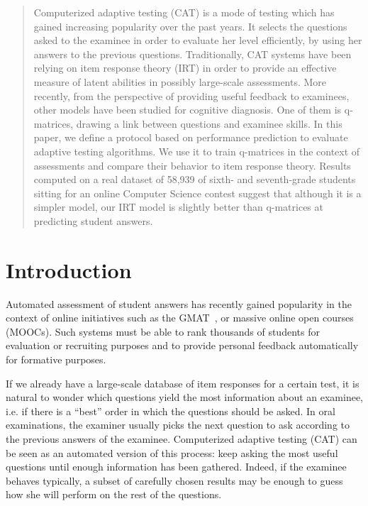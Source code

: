 \documentclass{sig-alternate}
\begin{document}
\maketitle
\begin{abstract}
Computerized adaptive testing (CAT) is a mode of testing which has gained increasing popularity over the past years. It selects the questions asked to the examinee in order to evaluate her level efficiently, by using her answers to the previous questions.
Traditionally, CAT systems have been relying on item response theory (IRT) in order to provide an effective measure of latent abilities in possibly large-scale assessments.
More recently, from the perspective of providing useful feedback to examinees, other models have been studied for cognitive diagnosis. One of them is q-matrices, drawing a link between questions and examinee skills.
In this paper, we define a protocol based on performance prediction to evaluate adaptive testing algorithms. We use it to train q-matrices in the context of assessments and compare their behavior to item response theory.
Results computed on a real dataset of 58,939 of sixth- and seventh-grade students sitting for an online Computer Science contest suggest that although it is a simpler model, our IRT model is slightly better than q-matrices at predicting student answers.
\end{abstract}




\newpage

\section{Introduction}
Automated assessment of student answers has recently gained popularity in the context of online initiatives such as the GMAT~\cite{Rudner2010}, or massive online open courses (MOOCs). Such systems must be able to rank thousands of students for evaluation or recruiting purposes and to provide personal feedback automatically for formative purposes.

If we already have a large-scale database of item responses for a certain test, it is natural to wonder which questions yield the most information about an examinee, i.e. if there is a ``best'' order in which the questions should be asked. In oral examinations, the examiner usually picks the next question to ask according to the previous answers of the examinee. Computerized adaptive testing (CAT) can be seen as an automated version of this process: keep asking the most useful questions until enough information has been gathered. Indeed, if the examinee behaves typically, a subset of carefully chosen results may be enough to guess how she will perform on the rest of the questions.
\end{document}
